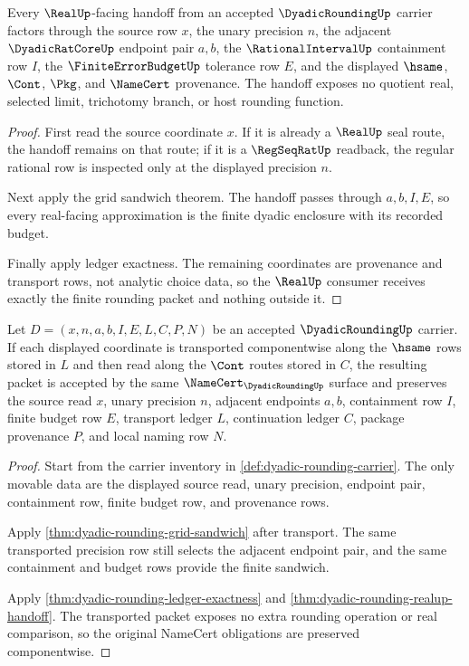 \begin{theorem}
\label{thm:dyadic-rounding-realup-handoff}
Every $\RealUp$-facing handoff from an accepted $\DyadicRoundingUp$ carrier factors through the source row $x$, the unary precision $n$, the adjacent $\DyadicRatCoreUp$ endpoint pair $a,b$, the $\RationalIntervalUp$ containment row $I$, the $\FiniteErrorBudgetUp$ tolerance row $E$, and the displayed $\hsame$, $\Cont$, $\Pkg$, and $\NameCert$ provenance. The handoff exposes no quotient real, selected limit, trichotomy branch, or host rounding function.
\end{theorem}
\begin{proof}
First read the source coordinate $x$. If it is already a $\RealUp$ seal route, the handoff remains on that route; if it is a $\RegSeqRatUp$ readback, the regular rational row is inspected only at the displayed precision $n$.

Next apply the grid sandwich theorem. The handoff passes through $a,b,I,E$, so every real-facing approximation is the finite dyadic enclosure with its recorded budget.

Finally apply ledger exactness. The remaining coordinates are provenance and transport rows, not analytic choice data, so the $\RealUp$ consumer receives exactly the finite rounding packet and nothing outside it.
\end{proof}

\begin{theorem}
\label{thm:dyadic-rounding-transport-stability}
Let $D=(x,n,a,b,I,E,L,C,P,N)$ be an accepted $\DyadicRoundingUp$ carrier. If each displayed coordinate is transported componentwise along the $\hsame$ rows stored in $L$ and then read along the $\Cont$ routes stored in $C$, the resulting packet is accepted by the same $\NameCert_{\DyadicRoundingUp}$ surface and preserves the source read $x$, unary precision $n$, adjacent endpoints $a,b$, containment row $I$, finite budget row $E$, transport ledger $L$, continuation ledger $C$, package provenance $P$, and local naming row $N$.
\end{theorem}
\begin{proof}
Start from the carrier inventory in \autoref{def:dyadic-rounding-carrier}. The only movable data are the displayed source read, unary precision, endpoint pair, containment row, finite budget row, and provenance rows.

Apply \autoref{thm:dyadic-rounding-grid-sandwich} after transport. The same transported precision row still selects the adjacent endpoint pair, and the same containment and budget rows provide the finite sandwich.

Apply \autoref{thm:dyadic-rounding-ledger-exactness} and \autoref{thm:dyadic-rounding-realup-handoff}. The transported packet exposes no extra rounding operation or real comparison, so the original NameCert obligations are preserved componentwise.
\end{proof}

